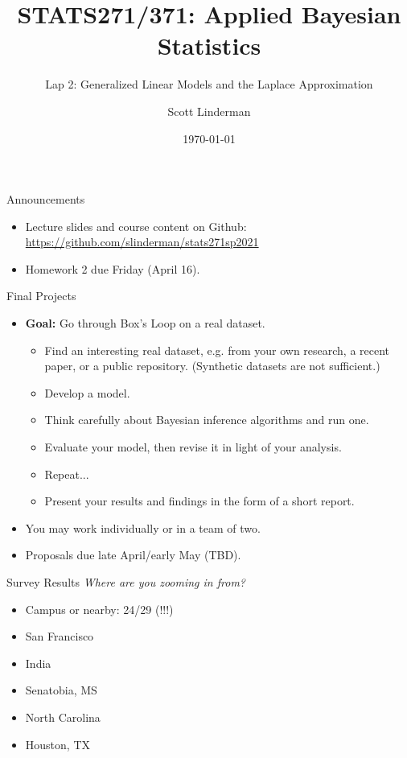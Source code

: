 \documentclass[aspectratio=169]{beamer}
\title{STATS271/371: Applied Bayesian Statistics}
\subtitle{Lap 2: Generalized Linear Models and the Laplace Approximation}
\author{Scott Linderman}
\date{\today}
\begin{document}
\maketitle


\begin{frame}{Announcements}

\begin{itemize}
    \item Lecture slides and course content on Github: \url{https://github.com/slinderman/stats271sp2021}
    
    \item Homework 2 due Friday (April 16).
\end{itemize}
    
\end{frame}

\begin{frame}{Final Projects}
    \begin{itemize}
        \item \textbf{Goal:} Go through Box's Loop on a real dataset.
        \begin{itemize}
        \item Find an interesting real dataset, e.g. from your own research, a recent paper, or a public repository. (Synthetic datasets are not sufficient.)
        \item Develop a model. 
        \item Think carefully about Bayesian inference algorithms and run one.
        \item Evaluate your model, then revise it in light of your analysis. 
        \item Repeat...
        \item Present your results and findings in the form of a short report. 
        \end{itemize}
        
    \item You may work individually or in a team of two.
    \item Proposals due late April/early May (TBD).
    \end{itemize}
\end{frame}

\begin{frame}{Survey Results}
\textit{Where are you zooming in from?}
\begin{itemize}
    \item Campus or nearby: 24/29 (!!!)
    \item San Francisco
    \item India
    \item Senatobia, MS
    \item North Carolina
    \item Houston, TX
\end{itemize}
\end{frame}
\end{document}
